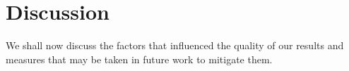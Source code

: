 \documentclass[twocol]{ametsocV6.1}
\begin{document}

\section{Discussion} \label{sec:discussion}
We shall now discuss the factors that influenced the quality of our results
and measures that may be taken in future work to mitigate them.
\end{document}

